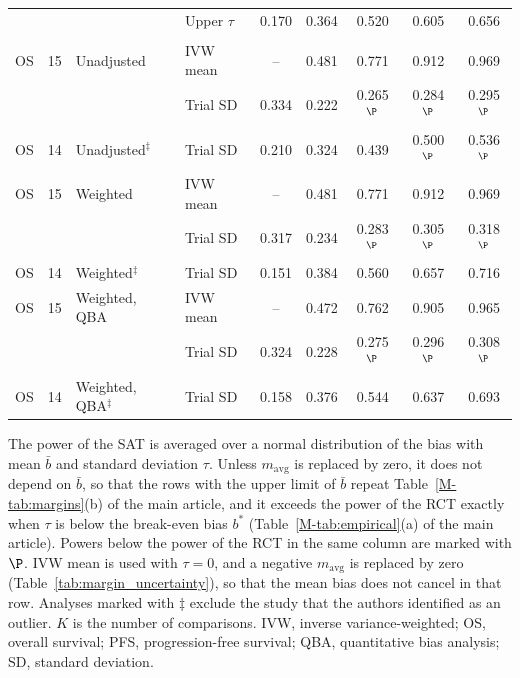 \begin{table}[!htb]
\begin{tabular}{lcllccccc}
 &  &  & Upper $\tau$ & 0.170 & 0.364 & 0.520 & 0.605 & 0.656 \\
\addlinespace
\multicolumn{9}{l}{Gupta et al.~\cite{Gupta2025}} \\
OS & 15 & Unadjusted & IVW mean & -- & 0.481 & 0.771 & 0.912 & 0.969 \\
 &  &  & Trial SD & 0.334 & 0.222 & 0.265$^{\P}$ & 0.284$^{\P}$ & 0.295$^{\P}$ \\
OS & 14 & Unadjusted$^{\ddagger}$ & Trial SD & 0.210 & 0.324 & 0.439 & 0.500$^{\P}$ & 0.536$^{\P}$ \\
OS & 15 & Weighted & IVW mean & -- & 0.481 & 0.771 & 0.912 & 0.969 \\
 &  &  & Trial SD & 0.317 & 0.234 & 0.283$^{\P}$ & 0.305$^{\P}$ & 0.318$^{\P}$ \\
OS & 14 & Weighted$^{\ddagger}$ & Trial SD & 0.151 & 0.384 & 0.560 & 0.657 & 0.716 \\
OS & 15 & Weighted, QBA & IVW mean & -- & 0.472 & 0.762 & 0.905 & 0.965 \\
 &  &  & Trial SD & 0.324 & 0.228 & 0.275$^{\P}$ & 0.296$^{\P}$ & 0.308$^{\P}$ \\
OS & 14 & Weighted, QBA$^{\ddagger}$ & Trial SD & 0.158 & 0.376 & 0.544 & 0.637 & 0.693 \\
\bottomrule
\end{tabular}
\par\smallskip
\begin{minipage}{0.95\linewidth}
\footnotesize
The power of the SAT is averaged over a normal distribution of the bias with mean $\bar{b}$ and standard deviation $\tau$. Unless $m_{\mathrm{avg}}$ is replaced by zero, it does not depend on $\bar{b}$, so that the rows with the upper limit of $\bar{b}$ repeat Table~\ref{M-tab:margins}(b) of the main article, and it exceeds the power of the RCT exactly when $\tau$ is below the break-even bias $b^{*}$ (Table~\ref{M-tab:empirical}(a) of the main article). Powers below the power of the RCT in the same column are marked with $\P$. IVW mean is used with $\tau = 0$, and a negative $m_{\mathrm{avg}}$ is replaced by zero (Table~\ref{tab:margin_uncertainty}), so that the mean bias does not cancel in that row. Analyses marked with $\ddagger$ exclude the study that the authors identified as an outlier. $K$ is the number of comparisons. IVW, inverse variance-weighted; OS, overall survival; PFS, progression-free survival; QBA, quantitative bias analysis; SD, standard deviation.
\end{minipage}
\end{table}
